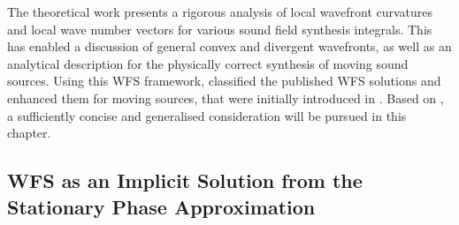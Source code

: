 The theoretical work \cite{Firtha2019_diss} presents a rigorous analysis of
local wavefront curvatures and local wave number vectors for various
sound field synthesis integrals.
This has enabled a discussion of general convex and divergent wavefronts,
as well as an analytical description for the physically correct synthesis of
moving sound sources.
%
Using this WFS framework, \cite{Firtha2019_diss} classified the published
WFS solutions and enhanced them for moving sources,
that were initially introduced in \cite{Franck2007, Ahrens2011}.
%
Based on \cite{ZotterSchultz2020_White}, a sufficiently concise and
generalised consideration will be pursued in this chapter.



\subsection{WFS as an Implicit Solution from the Stationary Phase
Approximation}

